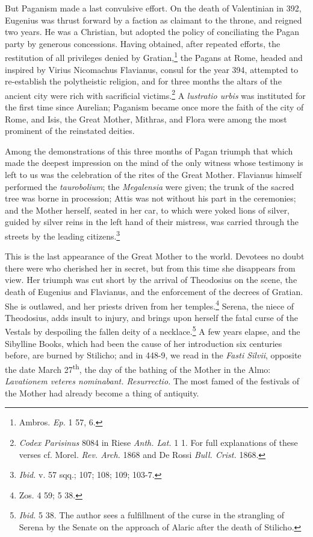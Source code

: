 \documentclass[a4paper, 11pt, oneside, polutonikogreek, french]{article}
\begin{document}
But Paganism made a last convulsive effort. On the death of Valentinian in 392, Eugenius was thrust forward by a faction as claimant to the throne, and reigned two years. He was a Christian, but adopted the policy of conciliating the Pagan party by generous concessions. Having obtained, after repeated efforts, the restitution of all privileges denied by Gratian,\footnote{Ambros. \emph{Ep.} 1 57, 6.} the Pagans at Rome, headed and inspired by Virius Nicomachus Flavianus, consul for the year 394, attempted to re-establish the polytheistic religion, and for three months the altars of the ancient city were rich with sacrificial victims.\footnote{\emph{Codex Parisinus} 8084 in Riese \emph{Anth. Lat.} 1 1. For full explanations of these verses cf. Morel. \emph{Rev. Arch.} 1868 and De Rossi \emph{Bull. Crist.} 1868.} A \emph{lustratio urbis} was instituted for the first time since Aurelian; Paganism became once more the faith of the city of Rome, and Isis, the Great Mother, Mithras, and Flora were among the most prominent of the reinstated deities.

Among the demonstrations of this three months of Pagan triumph that which made the deepest impression on the mind of the only witness whose testimony is left to us was the celebration of the rites of the Great Mother. Flavianus himself performed the \emph{taurobolium}; the \emph{Megalensia} were given; the trunk of the sacred tree was borne in procession; Attis was not without his part in the ceremonies; and the Mother herself, seated in her car, to which were yoked lions of silver, guided by silver reins in the left hand of their mistress, was carried through the streets by the leading citizens.\footnote{\emph{Ibid.} v. 57 sqq.; 107; 108; 109; 103-7.}

This is the last appearance of the Great Mother to the world. Devotees no doubt there were who cherished her in secret, but from this time she disappears from view. Her triumph was cut short by the arrival of Theodosius on the scene, the death of Eugenius and Flavianus, and the enforcement of the decrees of Gratian. She is outlawed, and her priests driven from her temples.\footnote{Zos. 4 59; 5 38.} Serena, the niece of Theodosius, adds insult to injury, and brings upon herself the fatal curse of the Vestals by despoiling the fallen deity of a necklace.\footnote{\emph{Ibid.} 5 38. The author sees a fulfillment of the curse in the strangling of Serena by the Senate on the approach of Alaric after the death of Stilicho.} A few years elapse, and the Sibylline Books, which had been the cause of her introduction six centuries before, are burned by Stilicho; and in 448-9, we read in the \emph{Fasti Silvii}, opposite the date March 27\textsuperscript{th}, the day of the bathing of the Mother in the Almo: \emph{Lavationem veteres nominabant. Resurrectio.} The most famed of the festivals of the Mother had already become a thing of antiquity.
\end{document}
